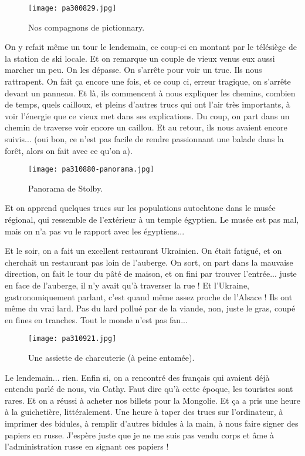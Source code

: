 \documentclass{book}
\begin{document}
\begin{figure}[h]
\centering
\texttt{[image: pa300829.jpg]}
\caption*{ Nos compagnons de pictionnary.}
\end{figure}

On y refait même un tour le lendemain, ce coup-ci en montant par le télésiège de la station de ski locale. Et on remarque un couple de vieux venus eux aussi marcher un peu. On les dépasse. On s'arrête pour voir un truc. Ils nous rattrapent. On fait ça encore une fois, et ce coup ci, erreur tragique, on s'arrête devant un panneau. Et là, ils commencent à nous expliquer les chemins, combien de temps, quels cailloux, et pleins d'autres trucs qui ont l'air très importants, à voir l’énergie que ce vieux met dans ses explications. Du coup, on part dans un chemin de traverse voir encore un caillou. Et au retour, ils nous avaient encore suivis... (oui bon, ce n'est pas facile de rendre passionnant une balade dans la forêt, alors on fait avec ce qu'on a).


\begin{figure}[h]
\centering
\texttt{[image: pa310880-panorama.jpg]}
\caption*{ Panorama de Stolby.}
\end{figure}

Et on apprend quelques trucs sur les populations autochtone dans le musée régional, qui ressemble de l'extérieur à un temple égyptien. Le musée est pas mal, mais on n'a pas vu le rapport avec les égyptiens...

Et le soir, on a fait un excellent restaurant Ukrainien. On était fatigué, et on cherchait un restaurant pas loin de l'auberge. On sort, on part dans la mauvaise direction, on fait le tour du pâté de maison, et on fini par trouver l'entrée... juste en face de l'auberge, il n'y avait qu'à traverser la rue ! Et l'Ukraine, gastronomiquement parlant, c'est quand même assez proche de l'Alsace ! Ils ont même du vrai lard. Pas du lard pollué par de la viande, non, juste le gras, coupé en fines en tranches. Tout le monde n'est pas fan...


\begin{figure}[h]
\centering
\texttt{[image: pa310921.jpg]}
\caption*{ Une assiette de charcuterie (à peine entamée).}
\end{figure}

Le lendemain... rien. Enfin si, on a rencontré des français qui avaient déjà entendu parlé de nous, via Cathy. Faut dire qu'à cette époque, les touristes sont rares. Et on a réussi à acheter nos billets pour la Mongolie. Et ça a pris une heure à la guichetière, littéralement. Une heure à taper des trucs sur l'ordinateur, à imprimer des bidules, à remplir d'autres bidules à la main, à nous faire signer des papiers en russe. J'espère juste que je ne me suis pas vendu corps et âme à l'administration russe en signant ces papiers !
\end{document}
